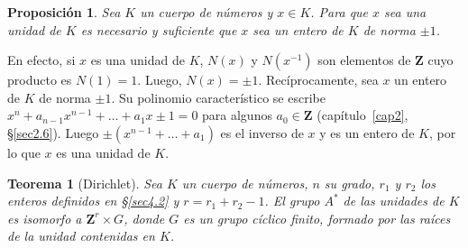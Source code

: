\documentclass[bibtotoc,leqno,spanish]{amsbook}
\newcommand{\ZZ}{\mathbf{Z}}
\numberwithin{equation}{section}
\theoremstyle{note}
\theoremstyle{note}
\newtheorem{theorem}{Teorema}
\newtheorem{proposition}{Proposici\'on}
\theoremstyle{rem}
\numberwithin{theorem}{section}
\numberwithin{proposition}{section}
\numberwithin{definition}{section}
\numberwithin{lemma}{section}
\numberwithin{corollary}{section}
\numberwithin{example}{section}
\numberwithin{footnote}{section}%
\begin{document}
\begin{proposition}\label{prop4.4.1}
Sea $K$ un cuerpo de n\'umeros y $x\in K$. Para que $x$ sea una unidad de $K$ es
necesario y suficiente que $x$ sea un entero de $K$ de norma $\pm 1$.
\end{proposition}

En efecto, si $x$ es una unidad de $K$, $N(x)$ y $N(x^{-1})$ son elementos de $\ZZ$ cuyo producto es
$N(1) = 1$. Luego, $N(x) = \pm 1$. Rec\'iprocamente, sea $x$ un entero de $K$ de norma $\pm 1$. Su
polinomio caracter\'istico se escribe $x^{n}+a_{n-1}x^{n-1}+\dots+a_{1}x\pm 1= 0$ para algunos
$a_{0}\in\ZZ$ (cap\'itulo~\ref{cap2}, \S\ref{sec2.6}). Luego $\pm(x^{n-1}+\dots+a_{1})$ es el inverso de $x$ y es un entero de
$K$, por lo que $x$ es una unidad de $K$.

\begin{theorem}[Dirichlet]\label{teo4.4.1}
Sea $K$ un cuerpo de n\'umeros, $n$ su grado, $r_{1}$ y $r_{2}$ los enteros definidos en \S\ref{sec4.2}
y $r = r_{1}+r_{2}-1$. El grupo $A^{*}$ de las unidades de $K$ es isomorfo a $\ZZ^{r}\times G$, donde
$G$ es un grupo c\'iclico finito, formado por las ra\'ices de la unidad contenidas en $K$.
\end{theorem}
\end{document}
